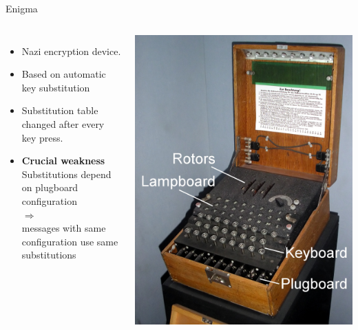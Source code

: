\documentclass[xcolor={usenames,svgnames,x11names,dvipsnames,table}]{beamer}
\begin{document}
\begin{frame}{Enigma}
    \begin{columns}
        \begin{itemize}
            \item Nazi encryption device.
            \item Based on automatic key substitution
            \item Substitution table changed after every key press.
            \item \textbf{Crucial weakness}\\
                Substitutions depend on plugboard configuration\\
                $\Rightarrow$\\
                messages with same configuration use same substitutions
        \end{itemize}

        \includegraphics[width=1\linewidth]{./img/enigma}
    \end{columns}
\end{frame}
\end{document}
